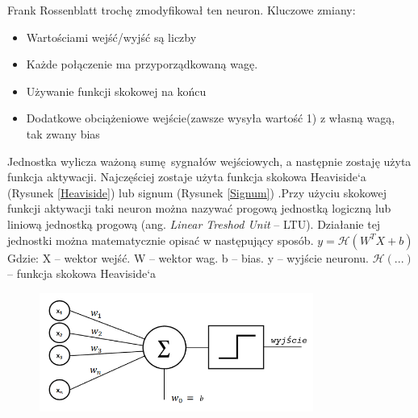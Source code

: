 \documentclass{article}
\begin{document}
Frank Rossenblatt trochę zmodyfikował ten neuron.\newline
Kluczowe zmiany:
\begin{itemize}
	\item Wartościami wejść/wyjść są liczby
	\item Każde połączenie ma przyporządkowaną wagę.
	\item Używanie funkcji skokowej na końcu
	\item Dodatkowe obciążeniowe wejście(zawsze wysyła wartość 1) z własną wagą, tak zwany bias
\end{itemize}
Jednostka wylicza ważoną sumę sygnałów wejściowych, a następnie zostaję użyta funkcja aktywacji. Najczęściej zostaje użyta funkcja skokowa Heaviside`a (Rysunek \ref{Heaviside}) lub signum (Rysunek \ref{Signum}) .Przy użyciu skokowej funkcji aktywacji taki neuron można nazywać progową jednostką logiczną lub liniową jednostką progową (ang. \textit{Linear Treshod Unit} -- LTU). Działanie tej jednostki można matematycznie opisać w następujący sposób.\newline\newline
$ y = \mathcal{H}(W^{T}X + b) $\newline \newline
Gdzie: \newline
X -- wektor wejść. \newline
W -- wektor wag. \newline
b -- bias. \newline
y -- wyjście neuronu. \newline
$ \mathcal{H}(...) $ -- funkcja skokowa Heaviside`a\newline

\begin{figure}[H]
	\centering
	\includegraphics[width=0.8\textwidth,keepaspectratio=true]{neuron_rosenblatta}
\end{figure}

\end{document}
